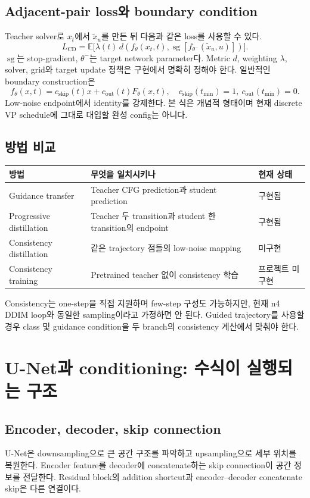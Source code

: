 \documentclass[11pt,a4paper]{article}
\newcommand{\E}{\mathbb{E}}
\begin{document}
\subsection{Adjacent-pair loss와 boundary condition}
Teacher solver로 $x_t$에서 $\tilde x_u$를 만든 뒤 다음과 같은 loss를 사용할 수 있다.
\[
L_{\mathrm{CD}}=\E\bigl[\lambda(t)\,
d(f_\theta(x_t,t),\operatorname{sg}[f_{\theta^-}(\tilde x_u,u)])\bigr].
\]
$\operatorname{sg}$는 stop-gradient, $\theta^-$는 target network parameter다. Metric $d$, weighting $\lambda$, solver, grid와 target update 정책은 구현에서 명확히 정해야 한다. 일반적인 boundary construction은
\[
f_\theta(x,t)=c_{\mathrm{skip}}(t)x+c_{\mathrm{out}}(t)F_\theta(x,t),\quad
c_{\mathrm{skip}}(t_{\min})=1,\ c_{\mathrm{out}}(t_{\min})=0.
\]
Low-noise endpoint에서 identity를 강제한다. 본 식은 개념적 형태이며 현재 discrete VP schedule에 그대로 대입할 완성 config는 아니다.

\subsection{방법 비교}
\par\noindent
\begin{tabularx}{\linewidth}{lYY}
\toprule 방법 & 무엇을 일치시키나 & 현재 상태 \\\midrule
Guidance transfer & Teacher CFG prediction과 student prediction & 구현됨 \\
Progressive distillation & Teacher 두 transition과 student 한 transition의 endpoint & 구현됨 \\
Consistency distillation & 같은 trajectory 점들의 low-noise mapping & 미구현 \\
Consistency training & Pretrained teacher 없이 consistency 학습 & 프로젝트 미구현 \\
\bottomrule
\end{tabularx}
\par
Consistency는 one-step을 직접 지원하며 few-step 구성도 가능하지만, 현재 n4 DDIM loop와 동일한 sampling이라고 가정하면 안 된다. Guided trajectory를 사용할 경우 class 및 guidance condition을 두 branch의 consistency 계산에서 맞춰야 한다.

\section{U-Net과 conditioning: 수식이 실행되는 구조}
\subsection{Encoder, decoder, skip connection}
U-Net은 downsampling으로 큰 공간 구조를 파악하고 upsampling으로 세부 위치를 복원한다. Encoder feature를 decoder에 concatenate하는 skip connection이 공간 정보를 전달한다. Residual block의 addition shortcut과 encoder--decoder concatenate skip은 다른 연결이다.
\end{document}
